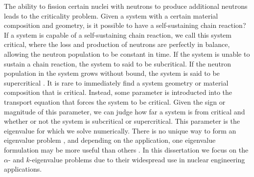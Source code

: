 The ability to fission certain nuclei with neutrons to produce additional neutrons leads to the criticality problem. Given a system with a certain material composition and geometry, is it possible to have a self-sustaining chain reaction? If a system is capable of a self-sustaining chain reaction, we call this system critical, where the loss and production of neutrons are perfectly in balance, allowing the neutron population to be constant in time. If the system is unable to sustain a chain reaction, the system to said to be subcritical. If the neutron population in the system grows without bound, the system is said to be supercritical \cite{bell_nuclear_1970}. It is rare to immediately find a system geometry or material composition that is critical. Instead, some parameter is introducted into the transport equation that forces the system to be critical. Given the sign or magnitude of this parameter, we can judge how far a system is from critical and whether or not the system is subcritical or supercritical. This parameter is the eigenvalue for which we solve numerically. There is no unique way to form an eigenvalue problem \cite{ronen_comparison_1976}, and depending on the application, one eigenvalue formulation may be more useful than others \cite{cacuci_eigenvalue-dependent_1982}. In this dissertation we focus on the $\alpha$- and $k$-eigenvalue problems due to their widespread use in nuclear engineering applications.

